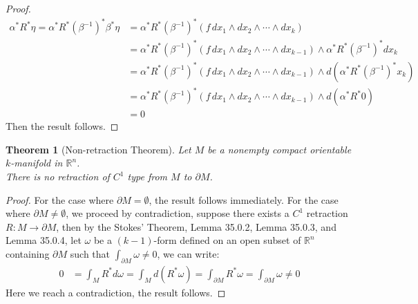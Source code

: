 \documentclass[11pt,oneside]{book}
\theoremstyle{break}
\theoremstyle{break}
\newtheorem{thm}{Theorem}[section]
\newcommand{\R}{\mathbb{R}}
\begin{document}
\begin{proof}
\begin{align*}
\alpha^*R^*\eta = \alpha^*R^*(\beta^{-1})^*\beta^*\eta &= \alpha^*R^*(\beta^{-1})^*(f\, dx_1 \wedge dx_2 \wedge \cdots \wedge dx_k)\\
&= \alpha^*R^*(\beta^{-1})^*(f\, dx_1\wedge dx_2 \wedge \cdots \wedge dx_{k-1})\wedge \alpha^*R^*(\beta^{-1})^*dx_k\\
&= \alpha^*R^*(\beta^{-1})^*(f\, dx_1\wedge dx_2 \wedge \cdots \wedge dx_{k-1})\wedge d(\alpha^*R^*(\beta^{-1})^*x_k)\\
&= \alpha^*R^*(\beta^{-1})^*(f\, dx_1\wedge dx_2 \wedge \cdots \wedge dx_{k-1})\wedge d(\alpha^*R^*0)\\
&= 0
\end{align*}
Then the result follows.
\end{proof}


\begin{thm}[Non-retraction Theorem]
Let $M$ be a nonempty compact orientable $k$-manifold in $\R^n$. \\
There is no retraction of $C^1$ type from $M$ to $\partial M$. 
\end{thm}
\begin{proof}
For the case where $\partial M = \emptyset$, the result follows immediately. For the case where $\partial M \neq \emptyset$, we proceed by contradiction, suppose there exists a $C^1$ retraction $R:M \to \partial M$, then by the Stokes' Theorem, Lemma 35.0.2, Lemma 35.0.3, and Lemma 35.0.4, let $\omega$ be a $(k-1)$-form defined on an open subset of $\R^n$ containing $\partial M$ such that $\int_{\partial M}\omega \neq 0$, we can write:
\begin{align*}
0 &= \int_M R^*d\omega = \int_M d(R^*\omega) = \int_{\partial M} R^*\omega = \int_{\partial M}\omega \neq 0
\end{align*}
Here we reach a contradiction, the result follows.
\end{proof}
\end{document}
